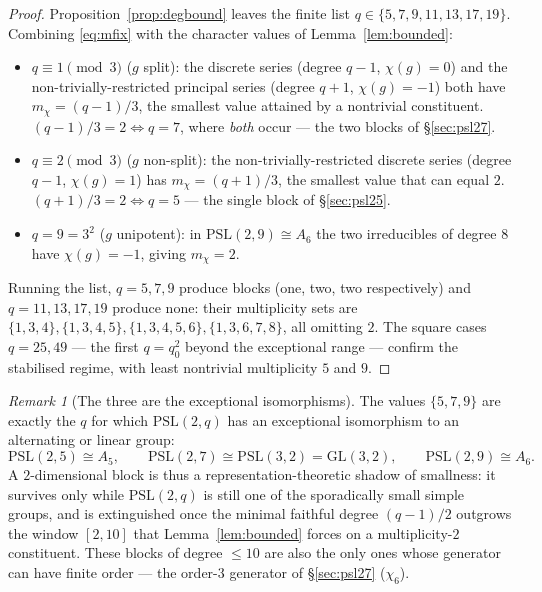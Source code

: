 \documentclass[11pt]{article}
\theoremstyle{remark}
\newtheorem{remark}[theorem]{Remark}
\begin{document}
\begin{proof}
Proposition~\ref{prop:degbound} leaves the finite list
$q\in\{5,7,9,11,13,17,19\}$. Combining \eqref{eq:mfix} with the character
values of Lemma~\ref{lem:bounded}:
\begin{itemize}
\item $q\equiv1\pmod3$ ($g$ split): the discrete series (degree $q-1$,
  $\chi(g)=0$) and the non-trivially-restricted principal series (degree
  $q+1$, $\chi(g)=-1$) both have $m_\chi=(q-1)/3$, the smallest value
  attained by a nontrivial constituent. $(q-1)/3=2\iff q=7$, where
  \emph{both} occur --- the two blocks of \S\ref{sec:psl27}.
\item $q\equiv2\pmod3$ ($g$ non-split): the non-trivially-restricted
  discrete series (degree $q-1$, $\chi(g)=1$) has $m_\chi=(q+1)/3$, the
  smallest value that can equal $2$. $(q+1)/3=2\iff q=5$ --- the single
  block of \S\ref{sec:psl25}.
\item $q=9=3^2$ ($g$ unipotent): in $\mathrm{PSL}(2,9)\cong A_6$ the two
  irreducibles of degree $8$ have $\chi(g)=-1$, giving $m_\chi=2$.
\end{itemize}
Running the list, $q=5,7,9$ produce blocks (one, two, two respectively) and
$q=11,13,17,19$ produce none: their multiplicity sets are
$\{1,3,4\},\{1,3,4,5\},\{1,3,4,5,6\},\{1,3,6,7,8\}$, all omitting $2$. The
square cases $q=25,49$ --- the first $q=q_0^2$ beyond the exceptional range
--- confirm the stabilised regime, with least nontrivial multiplicity $5$
and $9$.
\end{proof}

\begin{remark}[The three are the exceptional isomorphisms]\label{rem:excep}
The values $\{5,7,9\}$ are exactly the $q$ for which $\mathrm{PSL}(2,q)$ has
an exceptional isomorphism to an alternating or linear group:
\[
\mathrm{PSL}(2,5)\cong A_5,\qquad
\mathrm{PSL}(2,7)\cong \mathrm{PSL}(3,2)=\mathrm{GL}(3,2),\qquad
\mathrm{PSL}(2,9)\cong A_6.
\]
A $2$-dimensional block is thus a representation-theoretic shadow of
smallness: it survives only while $\mathrm{PSL}(2,q)$ is still one of the
sporadically small simple groups, and is extinguished once the minimal
faithful degree $(q-1)/2$ outgrows the window $[2,10]$ that
Lemma~\ref{lem:bounded} forces on a multiplicity-$2$ constituent. These
blocks of degree $\le 10$ are also the only ones whose generator can have
finite order --- the order-$3$ generator of \S\ref{sec:psl27} ($\chi_6$).
\end{remark}
\end{document}
